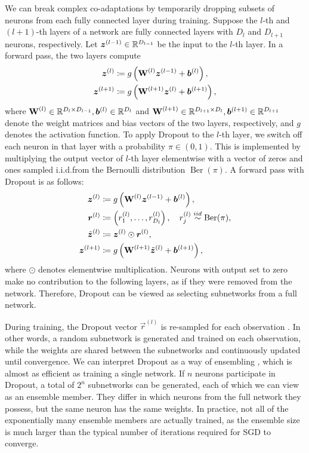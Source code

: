 We can break complex co-adaptations by temporarily dropping subsets of neurons from each fully connected layer during training. Suppose the $l$-th and $(l+1)$-th layers of a network are fully connected layers with $D_l$ and $D_{l+1}$ neurons, respectively. Let $\bm{z}^{(l-1)} \in \mathbb{R}^{D_{l-1}}$ be the input to the $l$-th layer. In a forward pass, the two layers compute
\begin{align*}
  \bm{z}^{(l)} &\coloneqq g\left( \bm{\mathbf{W}}^{(l)} \bm{z}^{(l-1)} + \bm{b}^{(l)}  \right), \\
  \bm{z}^{(l+1)} &\coloneqq g\left( \bm{\mathbf{W}}^{(l+1)} \bm{z}^{(l)} + \bm{b}^{(l+1)} \right),
\end{align*}
where $\bm{\mathbf{W}}^{(l)} \in \mathbb{R}^{D_{l} \times D_{l-1}}, \bm{b}^{(l)} \in \mathbb{R}^{D_{l}}$ and $\bm{\mathbf{W}}^{(l+1)} \in \mathbb{R}^{D_{l+1} \times D_{l}}, \bm{b}^{(l+1)} \in \mathbb{R}^{D_{l+1}}$ denote the weight matrices and bias vectors of the two layers, respectively, and $g$ denotes the activation function. To apply Dropout to the $l$-th layer, we switch off each neuron in that layer with a probability $\pi \in (0,1)$. This is implemented by multiplying the output vector of $l$-th layer elementwise with a vector of zeros and ones sampled i.i.d.\@ from the Bernoulli distribution $\operatorname{Ber}(\pi)$. A forward pass with Dropout is as follows:
\begin{align*}
  \bm{z}^{(l)} &\coloneqq g\left( \bm{\mathbf{W}}^{(l)} \bm{z}^{(l-1)} + \bm{b}^{(l)}  \right), \\
  \bm{r}^{(l)} &\coloneqq \left( r_1^{(l)}, \dots, r_{D_l}^{(l)} \right), \quad r_j^{(l)} \overset{iid}{\sim} \operatorname{Ber}(\pi), \\
  \tilde{\bm{z}}^{(l)} &\coloneqq \bm{z}^{(l)} \odot \bm{r}^{(l)}, \\
  \bm{z}^{(l+1)} &\coloneqq g\left( \bm{\mathbf{W}}^{(l+1)} \tilde{\bm{z}}^{(l)} + \bm{b}^{(l+1)} \right),
\end{align*}
where $\odot$ denotes elementwise multiplication. Neurons with output set to zero make no contribution to the following layers, as if they were removed from the network. Therefore, Dropout can be viewed as selecting subnetworks from a full network.

During training, the Dropout vector $\vec{r}^{(l)}$ is re-sampled for each observation \citep{srivastavaDropout2014}. In other words, a random subnetwork is generated and trained on each observation, while the weights are shared between the subnetworks and continuously updated until convergence. We can interpret Dropout as a way of ensembling \citep{hintonDropout2012}, which is almost as efficient as training a single network. If $n$ neurons participate in Dropout, a total of $2^n$ subnetworks can be generated, each of which we can view as an ensemble member. They differ in which neurons from the full network they possess, but the same neuron has the same weights. In practice, not all of the exponentially many ensemble members are actually trained, as the ensemble size is much larger than the typical number of iterations required for SGD to converge.

